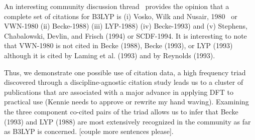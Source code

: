 \documentclass[11pt, oneside]{article}   	%
\begin{document}
An interesting community discussion thread~\citep{johansson2002} provides the opinion that a complete set of citations for B3LYP is (i) Vosko, Wilk and Nusair, 1980~\citep{vosko1980accurate} or VWN-1980 (ii) Becke-1988) (iii) LYP-1988) (iv) Becke-1993) and (v) Stephens, Chabalowski, Devlin, and Frisch (1994) or SCDF-1994. It is interesting to note that VWN-1980  is not cited in Becke (1988), Becke (1993), or LYP (1993) although it is cited by Laming et al. (1993)  and by Reynolds (1993).

Thus, we demonstrate one possible use of citation data, a high frequency triad discovered through a discipline-agnostic citation study leads us to a cluster of publications that are associated with a major advance in applying DFT to practical use (Kennie needs to approve or rewrite my hand waving). Examining the three component co-cited pairs of the triad allows us to infer that Becke (1993) and LYP (1988) are most extensively recognized in the community as far as B3LYP is concerned. [couple more sentences please].



\end{document}
